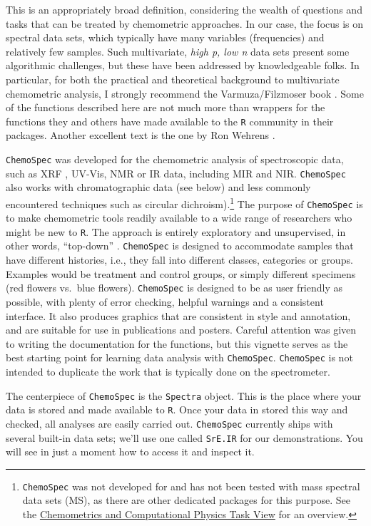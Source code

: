 \documentclass[letter,10pt,twocolumn,twoside,printwatermark=false]{pinp}
\begin{document}
This is an appropriately broad definition, considering the wealth of
questions and tasks that can be treated by chemometric approaches. In
our case, the focus is on spectral data sets, which typically have many
variables (frequencies) and relatively few samples. Such multivariate,
\emph{high p, low n} data sets present some algorithmic challenges, but
these have been addressed by knowledgeable folks. In particular, for
both the practical and theoretical background to multivariate
chemometric analysis, I strongly recommend the Varmuza/Filzmoser book
\citep{Filzmoser2009}. Some of the functions described here are not much
more than wrappers for the functions they and others have made available
to the \texttt{R} community in their packages. Another excellent text is
the one by Ron Wehrens \citep{Wehrens2011}.

\texttt{ChemoSpec} was developed for the chemometric analysis of
spectroscopic data, such as XRF \citep{Panchuk2018}, UV-Vis, NMR or IR
data, including MIR and NIR. \texttt{ChemoSpec} also works with
chromatographic data (see below) and less commonly encountered
techniques such as circular
dichroism).\footnote{\texttt{ChemoSpec} was not developed for and has not been tested with mass spectral data sets (MS), as there are other dedicated packages for this purpose.  See the \href{http://cran.at.r-project.org/web/views/ChemPhys.html}{Chemometrics and Computational Physics Task View} for an overview.}
The purpose of \texttt{ChemoSpec} is to make chemometric tools readily
available to a wide range of researchers who might be new to \texttt{R}.
The approach is entirely exploratory and unsupervised, in other words,
``top-down'' \citep{Wishart2007}. \texttt{ChemoSpec} is designed to
accommodate samples that have different histories, i.e., they fall into
different classes, categories or groups. Examples would be treatment and
control groups, or simply different specimens (red flowers vs.~blue
flowers). \texttt{ChemoSpec} is designed to be as user friendly as
possible, with plenty of error checking, helpful warnings and a
consistent interface. It also produces graphics that are consistent in
style and annotation, and are suitable for use in publications and
posters. Careful attention was given to writing the documentation for
the functions, but this vignette serves as the best starting point for
learning data analysis with \texttt{ChemoSpec}. \texttt{ChemoSpec} is
not intended to duplicate the work that is typically done on the
spectrometer.

The centerpiece of \texttt{ChemoSpec} is the \texttt{Spectra} object.
This is the place where your data is stored and made available to
\texttt{R}. Once your data in stored this way and checked, all analyses
are easily carried out. \texttt{ChemoSpec} currently ships with several
built-in data sets; we'll use one called \texttt{SrE.IR} for our
demonstrations. You will see in just a moment how to access it and
inspect it.
\end{document}
